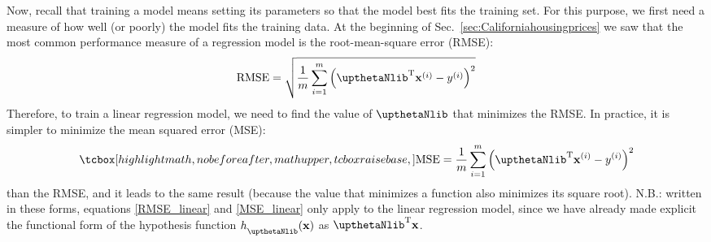 Now, recall that training a model means setting its parameters so that the model best fits the training set. For this purpose, we first need a measure of how well (or poorly) the model fits the training data. At the beginning of Sec.~\ref{sec:Californiahousingprices} we saw that the most common performance measure of a regression model is the root-mean-square error (RMSE):
\begin{equation}\label{RMSE_linear}
\operatorname{RMSE}=\sqrt{\frac{1}{m}\sum_{i=1}^m{\Bigl(\boldtheta^{\mathrm{T}}\mathbf{x}^{(i)}-y^{(i)}\Bigr)}^2}
\end{equation}
Therefore, to train a linear regression model, we need to find the value of $\boldtheta$ that minimizes the RMSE. In practice, it is simpler to minimize the mean squared error (MSE):
\begin{equation}\label{MSE_linear}
\tcbhighmath{\operatorname{MSE}=\frac{1}{m}\sum_{i=1}^m{\Bigl(\boldtheta^{\mathrm{T}}\mathbf{x}^{(i)}-y^{(i)}\Bigr)}^2}
\end{equation}
than the RMSE, and it leads to the same result (because the value that minimizes a function also minimizes its square root). N.B.: written in these forms, equations \eqref{RMSE_linear} and \eqref{MSE_linear} only apply to the linear regression model, since we have already made explicit the functional form of the hypothesis function $h_{\boldtheta}(\mathbf{x})$ as $\boldtheta^{\mathrm{T}}\mathbf{x}$.

